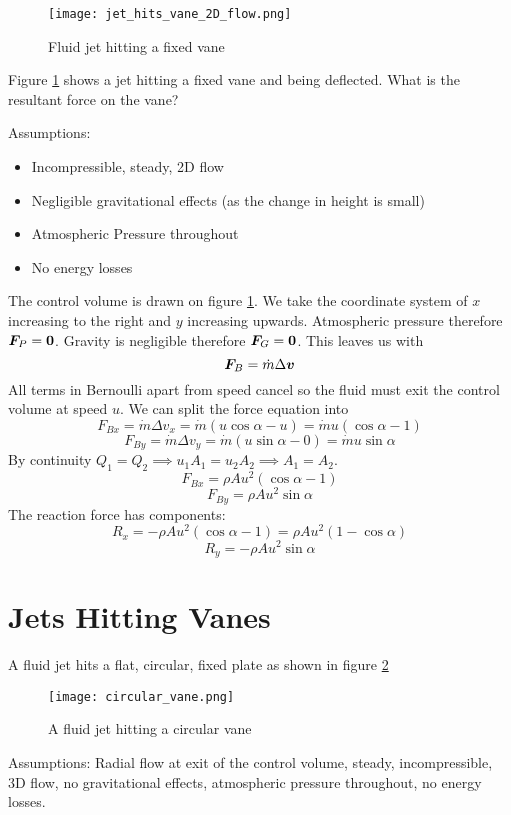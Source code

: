 \documentclass{article}
\begin{document}
    \example
    \begin{figure}[ht]
        \centering
        \texttt{[image: jet\_hits\_vane\_2D\_flow.png]}
        \caption{Fluid jet hitting a fixed vane}
        \label{fig:jet hits fixed vane 2D flow}
    \end{figure}
    Figure \ref{fig:jet hits fixed vane 2D flow} shows a jet hitting a fixed vane and being deflected.
    What is the resultant force on the vane?
    
    Assumptions:
    \begin{itemize}
        \item Incompressible, steady, 2D flow
        \item Negligible gravitational effects (as the change in height is small)
        \item Atmospheric Pressure throughout
        \item No energy losses
    \end{itemize}
    The control volume is drawn on figure \ref{fig:jet hits fixed vane 2D flow}.
    We take the coordinate system of \(x\) increasing to the right and \(y\) increasing upwards.
    Atmospheric pressure therefore \(\bm{F}_P = \bm{0}\).
    Gravity is negligible therefore \(\bm{F}_G = \bm{0}\).
    This leaves us with
    \[\bm{F}_B = \dot m\Delta\bm{v}\]
    All terms in Bernoulli apart from speed cancel so the fluid must exit the control volume at speed \(u\).
    We can split the force equation into
    \[F_{Bx} = \dot m\Delta v_x = \dot m(u\cos\alpha - u) = \dot mu(\cos\alpha - 1)\]
    \[F_{By} = \dot m\Delta v_y = \dot m(u\sin\alpha - 0) = \dot mu\sin\alpha\]
    By continuity \(Q_1 = Q_2\implies u_1A_1 = u_2A_2\implies A_1 = A_2\).
    \[F_{Bx} = \rho Au^2(\cos\alpha - 1)\]
    \[F_{By} = \rho Au^2\sin\alpha\]
    The reaction force has components:
    \[R_x = -\rho Au^2(\cos\alpha - 1) = \rho Au^2(1 - \cos\alpha)\]
    \[R_y = -\rho Au^2\sin\alpha\]
    
    \section{Jets Hitting Vanes}
    A fluid jet hits a flat, circular, fixed plate as shown in figure \ref{fig:circular vane}
    \begin{figure}
        \centering
        \texttt{[image: circular\_vane.png]}
        \caption{A fluid jet hitting a circular vane}
        \label{fig:circular vane}
    \end{figure}
    Assumptions: Radial flow at exit of the control volume, steady, incompressible, 3D flow, no gravitational effects, atmospheric pressure throughout, no energy losses.
    
\end{document}
